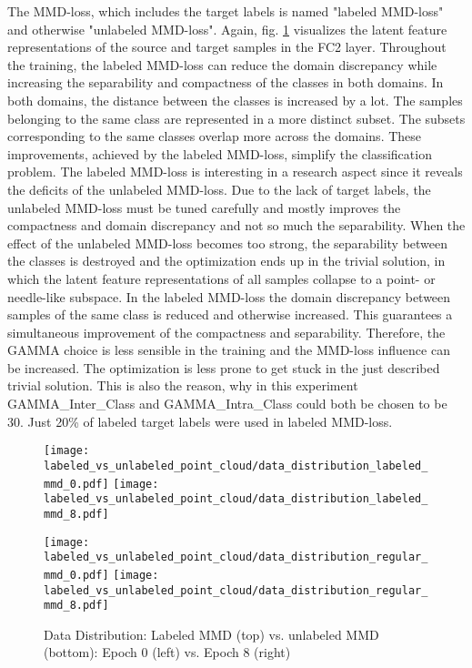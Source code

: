 The MMD-loss, which includes the target labels is named "labeled MMD-loss" and otherwise "unlabeled MMD-loss". Again, fig. \ref{fig:point_cloud_labeled_unlabeled_mmd} visualizes the latent feature representations of the source and target samples in the FC2 layer. Throughout the training, the labeled MMD-loss can reduce the domain discrepancy while increasing the separability and compactness of the classes in both domains. In both domains, the distance between the classes is increased by a lot. The samples belonging to the same class are represented in a more distinct subset. The subsets corresponding to the same classes overlap more across the domains. These improvements, achieved by the labeled MMD-loss, simplify the classification problem. The labeled MMD-loss is interesting in a research aspect since it reveals the deficits of the unlabeled MMD-loss. Due to the lack of target labels, the unlabeled MMD-loss must be tuned carefully and mostly improves the compactness and domain discrepancy and not so much the separability. When the effect of the unlabeled MMD-loss becomes too strong, the separability between the classes is destroyed and the optimization ends up in the trivial solution, in which the latent feature representations of all samples collapse to a point- or needle-like subspace. In the labeled MMD-loss the domain discrepancy between samples of the same class is reduced and otherwise increased. This guarantees a simultaneous improvement of the compactness and separability. Therefore, the GAMMA choice is less sensible in the training and the MMD-loss influence can be increased. The optimization is less prone to get stuck in the just described trivial solution. This is also the reason, why in this experiment GAMMA\_Inter\_Class and GAMMA\_Intra\_Class could both be chosen to be 30. Just 20\% of labeled target labels were used in labeled MMD-loss.

\begin{figure}[htp]
  \centering
  \texttt{[image: labeled\_vs\_unlabeled\_point\_cloud/data\_distribution\_labeled\_mmd\_0.pdf]}
  \hspace{.4cm}
  \texttt{[image: labeled\_vs\_unlabeled\_point\_cloud/data\_distribution\_labeled\_mmd\_8.pdf]}

  \vspace{.1cm}

  \texttt{[image: labeled\_vs\_unlabeled\_point\_cloud/data\_distribution\_regular\_mmd\_0.pdf]}
  \hspace{.4cm}
  \texttt{[image: labeled\_vs\_unlabeled\_point\_cloud/data\_distribution\_regular\_mmd\_8.pdf]}
  
  \caption{Data Distribution: Labeled MMD (top) vs. unlabeled MMD (bottom): Epoch 0 (left) vs. Epoch 8 (right)}
  \label{fig:point_cloud_labeled_unlabeled_mmd}
\end{figure}

